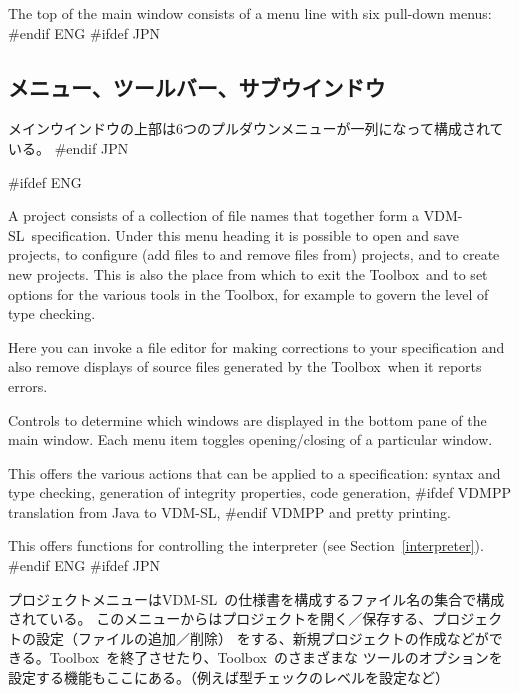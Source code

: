 \documentclass[\pformat,12pt]{article}
\newcommand{\vdmslpp}{VDM-SL}
\newcommand{\Toolbox}{Toolbox}
\newcommand{\vdmslpp}{VDM++}
\newcommand{\Toolbox}{Toolbox}
\newcommand{\guicmd}[1]{{\sf #1}}
\newcommand{\guicmd}[1]{{\gt #1}}
\begin{document}
The top of the main window consists of a menu line with six pull-down
menus:
#endif ENG
#ifdef JPN
\subsection{メニュー、ツールバー、サブウインドウ}

メインウインドウの上部は6つのプルダウンメニューが一列になって構成されている。
#endif JPN

\begin{description}
#ifdef ENG
\item[\guicmd{Project}:] A project consists of a
  collection of file  
  names that together form a \vdmslpp\ specification. Under this menu
  heading it is possible to open and save projects, to configure (add
  files to and remove files from) projects, and to create new
  projects. This is also the place from which to exit the \Toolbox\
  and to set options for the various tools in the \Toolbox, for
  example to govern the level of type checking.

\item[\guicmd{File}:] Here you can invoke a file editor for making
  corrections to your specification and also remove displays of source
  files generated by the \Toolbox\ when it reports errors.

\item[\guicmd{Windows}:] Controls to determine which windows are
  displayed in the bottom pane of the main window. Each menu item
  toggles opening/closing of a particular window.

\item[\guicmd{Actions}:] This offers the various
  actions that can be applied to a specification: syntax and type
  checking, generation of integrity properties, code generation, 
#ifdef VDMPP 
translation from Java to \vdmslpp, 
#endif VDMPP 
and pretty printing.

\item[\guicmd{Interpreter}:] This offers
  functions for controlling the interpreter (see
  Section~\ref{interpreter}).
#endif ENG
#ifdef JPN
\item[\guicmd{プロジェクト}:]
  プロジェクトメニューは\vdmslpp\ の仕様書を構成するファイル名の集合で構成されている。
  このメニューからはプロジェクトを開く／保存する、プロジェクトの設定（ファイルの追加／削除）
  をする、新規プロジェクトの作成などができる。\Toolbox\ を終了させたり、\Toolbox\ のさまざまな
  ツールのオプションを設定する機能もここにある。（例えば型チェックのレベルを設定など）


\end{description}
\end{document}
